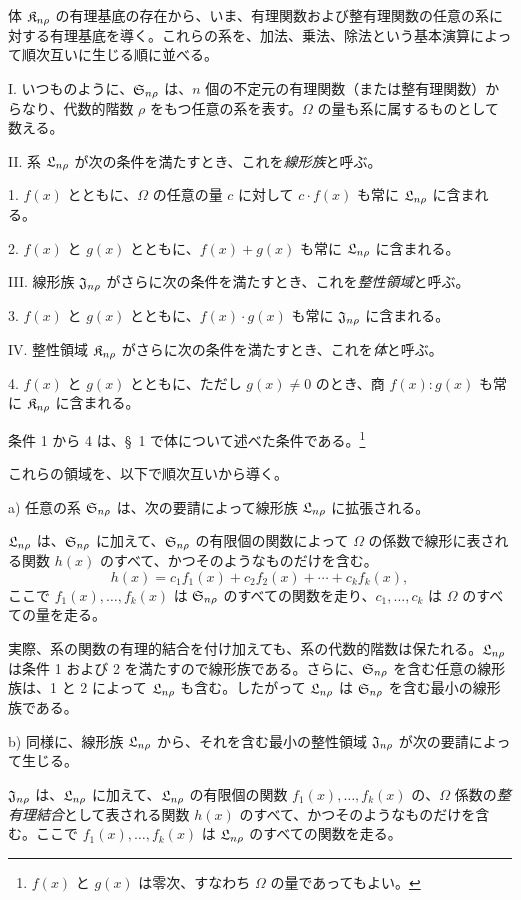 \documentclass[11pt]{article}
\begin{document}
体 $\mathfrak{K}_{n\rho}$ の有理基底の存在から、いま、有理関数および整有理関数の任意の系に対する有理基底を導く。これらの系を、加法、乗法、除法という基本演算によって順次互いに生じる順に並べる。

I. いつものように、$\mathfrak{S}_{n\rho}$ は、$n$ 個の不定元の有理関数（または整有理関数）からなり、代数的階数 $\rho$ をもつ任意の系を表す。$\Omega$ の量も系に属するものとして数える。

II. 系 $\mathfrak{L}_{n\rho}$ が次の条件を満たすとき、これを\emph{線形族}と呼ぶ。

1. $f(x)$ とともに、$\Omega$ の任意の量 $c$ に対して $c\cdot f(x)$ も常に $\mathfrak{L}_{n\rho}$ に含まれる。

2. $f(x)$ と $g(x)$ とともに、$f(x)+g(x)$ も常に $\mathfrak{L}_{n\rho}$ に含まれる。

III. 線形族 $\mathfrak{J}_{n\rho}$ がさらに次の条件を満たすとき、これを\emph{整性領域}と呼ぶ。

3. $f(x)$ と $g(x)$ とともに、$f(x)\cdot g(x)$ も常に $\mathfrak{J}_{n\rho}$ に含まれる。

IV. 整性領域 $\mathfrak{K}_{n\rho}$ がさらに次の条件を満たすとき、これを\emph{体}と呼ぶ。

4. $f(x)$ と $g(x)$ とともに、ただし $g(x)\ne0$ のとき、商 $f(x):g(x)$ も常に $\mathfrak{K}_{n\rho}$ に含まれる。

条件 1 から 4 は、\S\ 1 で体について述べた条件である。\footnote{$f(x)$ と $g(x)$ は零次、すなわち $\Omega$ の量であってもよい。}

これらの領域を、以下で順次互いから導く。

a) 任意の系 $\mathfrak{S}_{n\rho}$ は、次の要請によって線形族 $\mathfrak{L}_{n\rho}$ に拡張される。

$\mathfrak{L}_{n\rho}$ は、$\mathfrak{S}_{n\rho}$ に加えて、$\mathfrak{S}_{n\rho}$ の有限個の関数によって $\Omega$ の係数で線形に表される関数 $h(x)$ のすべて、かつそのようなものだけを含む。
\[
  h(x)=c_1f_1(x)+c_2f_2(x)+\cdots+c_kf_k(x),
\]
ここで $f_1(x),\ldots,f_k(x)$ は $\mathfrak{S}_{n\rho}$ のすべての関数を走り、$c_1,\ldots,c_k$ は $\Omega$ のすべての量を走る。

実際、系の関数の有理的結合を付け加えても、系の代数的階数は保たれる。$\mathfrak{L}_{n\rho}$ は条件 1 および 2 を満たすので線形族である。さらに、$\mathfrak{S}_{n\rho}$ を含む任意の線形族は、1 と 2 によって $\mathfrak{L}_{n\rho}$ も含む。したがって $\mathfrak{L}_{n\rho}$ は $\mathfrak{S}_{n\rho}$ を含む最小の線形族である。

b) 同様に、線形族 $\mathfrak{L}_{n\rho}$ から、それを含む最小の整性領域 $\mathfrak{J}_{n\rho}$ が次の要請によって生じる。

$\mathfrak{J}_{n\rho}$ は、$\mathfrak{L}_{n\rho}$ に加えて、$\mathfrak{L}_{n\rho}$ の有限個の関数 $f_1(x),\ldots,f_k(x)$ の、$\Omega$ 係数の\emph{整有理結合}として表される関数 $h(x)$ のすべて、かつそのようなものだけを含む。ここで $f_1(x),\ldots,f_k(x)$ は $\mathfrak{L}_{n\rho}$ のすべての関数を走る。
\end{document}
